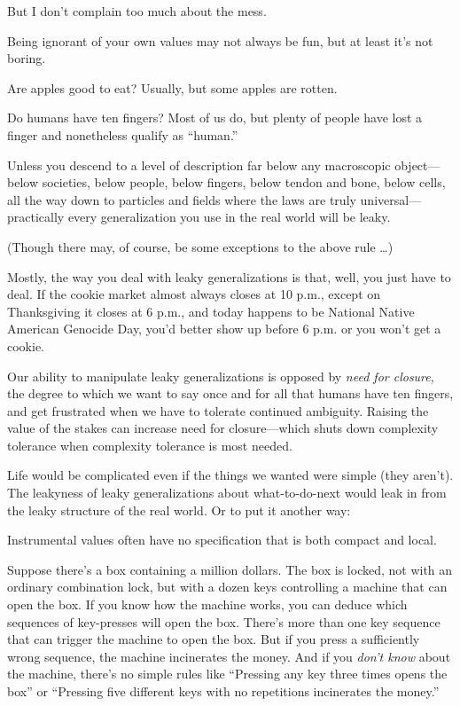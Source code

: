 {
 But I don't complain too much about the mess.}

{
 Being ignorant of your own values may not always be fun, but at
least it's not boring.}

\myendsectiontext


{
 Are apples good to eat? Usually, but some apples are rotten. }

{
 Do humans have ten fingers? Most of us do, but plenty of people
have lost a finger and nonetheless qualify as
``human.''}

{
 Unless you descend to a level of description far below any
macroscopic object---below societies, below people, below fingers,
below tendon and bone, below cells, all the way down to particles and
fields where the laws are truly universal---practically every
generalization you use in the real world will be leaky.}

{
 (Though there may, of course, be some exceptions to the above rule
\ldots)}

{
 Mostly, the way you deal with leaky generalizations is that, well,
you just have to deal. If the cookie market almost always closes at 10
p.m., except on Thanksgiving it closes at 6 p.m., and today happens to
be National Native American Genocide Day, you'd better
show up before 6 p.m. or you won't get a cookie.}

{
 Our ability to manipulate leaky generalizations is opposed by
\textit{need for closure}, the degree to which we want to say once and
for all that humans have ten fingers, and get frustrated when we have
to tolerate continued ambiguity. Raising the value of the stakes can
increase need for closure---which shuts down complexity tolerance when
complexity tolerance is most needed.}

{
 Life would be complicated even if the things we wanted were simple
(they aren't). The leakyness of leaky generalizations
about what-to-do-next would leak in from the leaky structure of the
real world. Or to put it another way:}

{
 Instrumental values often have no specification that is both
compact and local.}

{
 Suppose there's a box containing a million
dollars. The box is locked, not with an ordinary combination lock, but
with a dozen keys controlling a machine that can open the box. If you
know how the machine works, you can deduce which sequences of
key-presses will open the box. There's more than one
key sequence that can trigger the machine to open the box. But if you
press a sufficiently wrong sequence, the machine incinerates the money.
And if you \textit{don't know} about the machine,
there's no simple rules like
``Pressing any key three times opens the
box'' or ``Pressing five different
keys with no repetitions incinerates the money.''}

